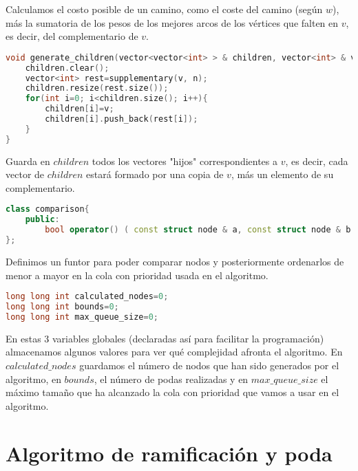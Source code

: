 \documentclass[11pt]{article}
\begin{document}
Calculamos el costo posible de un camino, como el coste del camino (según $w$), más la sumatoria de los pesos de los mejores arcos de los vértices que falten en $v$, es decir, del complementario de $v$.

\begin{lstlisting}[language=C++, caption=Generación de los hijos]
void generate_children(vector<vector<int> > & children, vector<int> & v, int n){
	children.clear();
	vector<int> rest=supplementary(v, n);
	children.resize(rest.size());
	for(int i=0; i<children.size(); i++){
		children[i]=v;
		children[i].push_back(rest[i]);
	}
}
\end{lstlisting}

Guarda en $children$ todos los vectores "hijos" correspondientes a $v$, es decir, cada vector de $children$ estará formado por una copia de $v$, más un elemento de su complementario.

\begin{lstlisting}[language=C++, caption=Comparación de nodos]
class comparison{ 
	public:
		bool operator() ( const struct node & a, const struct node & b ) { return a.cs < b.cs; } 
};
\end{lstlisting}

Definimos un funtor para poder comparar nodos y posteriormente ordenarlos de menor a mayor en la cola con prioridad usada en el algoritmo.

\begin{lstlisting}[language=C++, caption=Variables relativas a complejidad]
long long int calculated_nodes=0;
long long int bounds=0;
long long int max_queue_size=0;
\end{lstlisting}

En estas 3 variables globales (declaradas así para facilitar la programación) almacenamos algunos valores para ver qué complejidad afronta el algoritmo. En $calculated\_nodes$ guardamos el número de nodos que han sido generados por el algoritmo, en $bounds$, el número de podas realizadas y en $max\_queue\_size$ el máximo tamaño que ha alcanzado la cola con prioridad que vamos a usar en el algoritmo.

\newpage

\section{Algoritmo de ramificación y poda}
\end{document}
